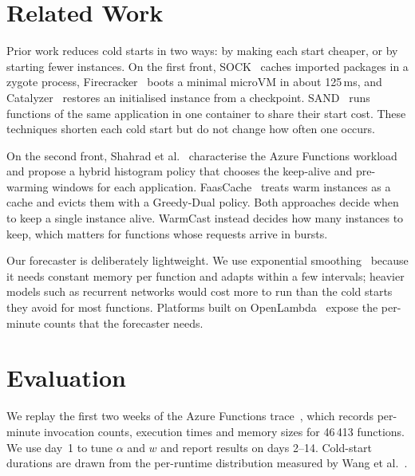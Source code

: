 \documentclass[10pt]{article}
\begin{document}
\section{Related Work}
\label{sec:related}

Prior work reduces cold starts in two ways: by making each start cheaper, or
by starting fewer instances. On the first front, SOCK~\cite{oakes2018sock}
caches imported packages in a zygote process, Firecracker~\cite{agache2020firecracker}
boots a minimal microVM in about 125\,ms, and Catalyzer~\cite{du2020catalyzer}
restores an initialised instance from a checkpoint. SAND~\cite{akkus2018sand}
runs functions of the same application in one container to share their start
cost. These techniques shorten each cold start but do not change how often
one occurs.

On the second front, Shahrad et al.~\cite{shahrad2020serverless} characterise
the Azure Functions workload and propose a hybrid histogram policy that
chooses the keep-alive and pre-warming windows for each application.
FaasCache~\cite{fuerst2021faascache} treats warm instances as a cache and
evicts them with a Greedy-Dual policy. Both approaches decide when to keep a
single instance alive. WarmCast instead decides how many instances to keep,
which matters for functions whose requests arrive in bursts.

Our forecaster is deliberately lightweight. We use exponential
smoothing~\cite{hyndman2021forecasting} because it needs constant memory per
function and adapts within a few intervals; heavier models such as recurrent
networks would cost more to run than the cold starts they avoid for most
functions. Platforms built on OpenLambda~\cite{hendrickson2016openlambda}
expose the per-minute counts that the forecaster needs.



\section{Evaluation}
\label{sec:eval}

We replay the first two weeks of the Azure Functions
trace~\cite{shahrad2020serverless}, which records per-minute invocation
counts, execution times and memory sizes for 46\,413 functions. We use day~1
to tune $\alpha$ and $w$ and report results on days 2--14. Cold-start
durations are drawn from the per-runtime distribution measured by Wang et
al.~\cite{wang2018peeking}.
\end{document}
